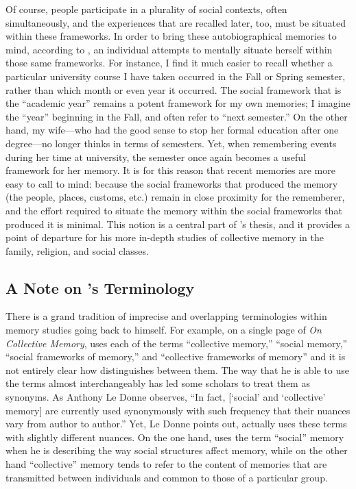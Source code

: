 Of course, people participate in a plurality of social contexts, often simultaneously, and the experiences that are recalled later, too, must be situated within these frameworks. In order to bring these autobiographical memories to mind, according to \halbwachs, an individual attempts to mentally situate herself within those same frameworks.%
    \autocite[38]{halbwachs1992}
For instance, I find it much easier to recall whether a particular university course I have taken occurred in the Fall or Spring semester, rather than which month or even year it occurred. The social framework that is the ``academic year'' remains a potent framework for my own memories; I imagine the ``year'' beginning in the Fall, and often refer to ``next semester.'' On the other hand, my wife---who had the good sense to stop her formal education after one degree---no longer thinks in terms of semesters. Yet, when remembering events during her time at university, the semester once again becomes a useful framework for her memory. It is for this reason that recent memories are more easy to call to mind: because the social frameworks that produced the memory (the people, places, customs, etc.) remain in close proximity for the rememberer, and the effort required to situate the memory within the social frameworks that produced it is minimal.%
    \autocite[52]{halbwachs1992}
This notion is a central part of \halbwachs's thesis, and it provides a point of departure for his more in-depth studies of collective memory in the family, religion, and social classes.  

\subsection{A Note on \halbwachs's Terminology}

There is a grand tradition of imprecise and overlapping terminologies within memory studies going back to \halbwachs himself. For example, on a single page of \emph{On Collective Memory}, \halbwachs uses each of the terms ``collective memory,'' ``social memory,'' ``social frameworks of memory,'' and ``collective frameworks of memory'' and it is not entirely clear how \halbwachs distinguishes between them.%
    \autocite[40]{halbwachs1992}
The way that he is able to use the terms almost interchangeably has led some scholars to treat them as synonyms. As Anthony Le Donne observes, ``In fact, {[}`social' and `collective' memory{]} are currently used synonymously with such frequency that their nuances vary from author to author.''%
    \autocite[42 n.8]{ledonne2009}
Yet, Le Donne points out, \halbwachs actually uses these terms with slightly different nuances. On the one hand, \halbwachs uses the term ``social'' memory when he is describing the way social structures affect memory, while on the other hand ``collective'' memory tends to refer to the content of memories that are transmitted between individuals and common to those of a particular group.  

